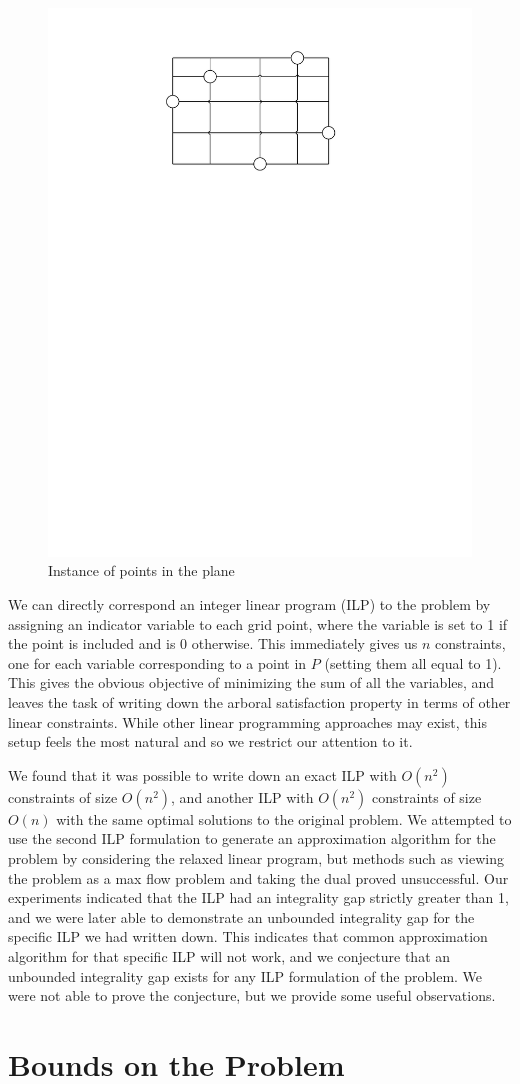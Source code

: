 \documentclass[11pt]{article}
\begin{document}
\begin{figure}
\centering
\includegraphics[width=0.3\linewidth]{instance.pdf}
\caption{Instance of points in the plane}
\label{fig:instance}
\end{figure}

We can directly correspond an integer linear program (ILP) to the problem by assigning an indicator variable to each grid point, where the variable is set to 1 if the point is included and is 0 otherwise. This immediately gives us $n$ constraints, one for each variable corresponding to a point in $P$ (setting them all equal to 1). This gives the obvious objective of minimizing the sum of all the variables, and leaves the task of writing down the arboral satisfaction property in terms of other linear constraints. While other linear programming approaches may exist, this setup feels the most natural and so we restrict our attention to it.

We found that it was possible to write down an exact ILP with $O(n^2)$ constraints of size $O(n^2)$, and another ILP with $O(n^2)$ constraints of size $O(n)$ with the same optimal solutions to the original problem. We attempted to use the second ILP formulation to generate an approximation algorithm for the problem by considering the relaxed linear program, but methods such as viewing the problem as a max flow problem and taking the dual proved unsuccessful. Our experiments indicated that the ILP had an integrality gap strictly greater than 1, and we were later able to demonstrate an unbounded integrality gap for the specific ILP we had written down. This indicates that common approximation algorithm for that specific ILP will not work, and we conjecture that an unbounded integrality gap exists for any ILP formulation of the problem. We were not able to prove the conjecture, but we provide some useful observations.

\section{Bounds on the Problem}
\end{document}
